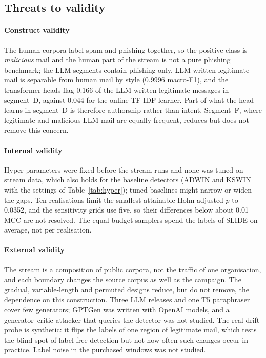 \subsection{Threats to validity}\label{sec:validity}
\paragraph{Construct validity} The human corpora label spam and phishing together, so the positive class is \emph{malicious} mail and the human part of the stream is not a pure phishing benchmark; the LLM segments contain phishing only. LLM-written legitimate mail is separable from human mail by style (0.9996 macro-F1), and the transformer heads flag 0.166 of the LLM-written legitimate messages in segment~D, against 0.044 for the online TF-IDF learner. Part of what the head learns in segment~D is therefore authorship rather than intent. Segment~F, where legitimate and malicious LLM mail are equally frequent, reduces but does not remove this concern.

\paragraph{Internal validity} Hyper-parameters were fixed before the stream runs and none was tuned on stream data, which also holds for the baseline detectors (ADWIN and KSWIN with the settings of Table~\ref{tab:hyper}); tuned baselines might narrow or widen the gaps. Ten realisations limit the smallest attainable Holm-adjusted $p$ to 0.0352, and the sensitivity grids use five, so their differences below about 0.01 MCC are not resolved. The equal-budget samplers spend the labels of SLIDE on average, not per realisation.

\paragraph{External validity} The stream is a composition of public corpora, not the traffic of one organisation, and each boundary changes the source corpus as well as the campaign. The gradual, variable-length and permuted designs reduce, but do not remove, the dependence on this construction. Three LLM releases and one T5 paraphraser cover few generators; GPTGen was written with OpenAI models, and a generator--critic attacker that queries the detector \cite{qi2025} was not studied. The real-drift probe is synthetic: it flips the labels of one region of legitimate mail, which tests the blind spot of label-free detection but not how often such changes occur in practice. Label noise in the purchased windows was not studied.
